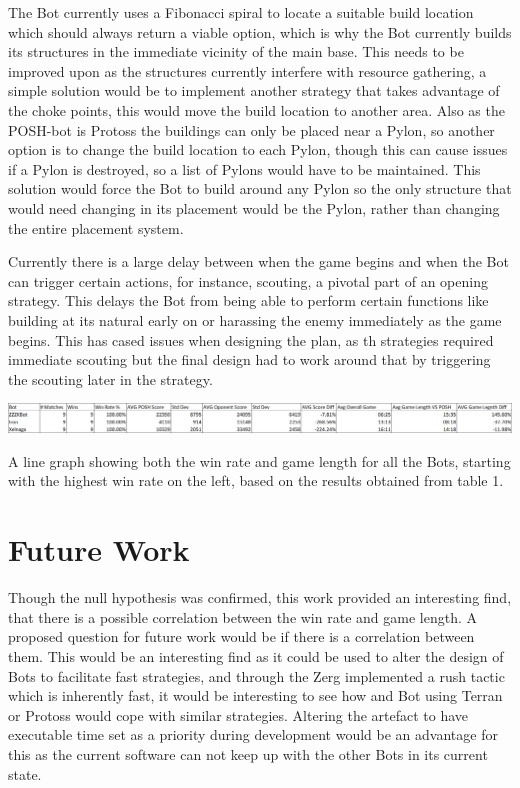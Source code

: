\documentclass[journal]{IEEEtran}
\begin{document}
	The Bot currently uses a Fibonacci spiral to locate a suitable build location which should always return a viable option, which is why the Bot currently builds its structures in the immediate vicinity of the main base. This needs to be improved upon as the structures currently interfere with resource gathering, a simple solution would be to implement another strategy that takes advantage of the choke points, this would move the build location to another area. Also as the POSH-bot is Protoss the buildings can only be placed near a Pylon, so another option is to change the build location to each Pylon, though this can cause issues if a Pylon is destroyed, so a list of Pylons would have to be maintained. This solution would force the Bot to build around any Pylon so the only structure that would need changing in its placement would be the Pylon, rather than changing the entire placement system.
	
	Currently there is a large delay between when the game begins and when the Bot can trigger certain actions, for instance, scouting, a pivotal part of an opening strategy. This delays the Bot from being able to perform certain functions like building at its natural early on or harassing the enemy immediately as the game begins. This has cased issues when designing the plan, as th strategies required immediate scouting but the final design had to work around that by triggering the scouting later in the strategy.	
	\begin{table}
		\centering
		\includegraphics[width=\textwidth]{PvsBots}
		\caption{A line graph showing both the win rate and game length for all the Bots, starting with the highest win rate on the left, based on the results obtained from table 1.}
		\label{Table6}
	\end{table}
	
	\section{Future Work}
	Though the null hypothesis was confirmed, this work provided an interesting find, that there is a possible correlation between the win rate and game length. A proposed question for future work would be if there is a correlation between them. This would be an interesting find as it could be used to alter the design of Bots to facilitate fast strategies, and through the Zerg implemented a rush tactic which is inherently fast, it would be interesting to see how and Bot using Terran or Protoss would cope with similar strategies.
	Altering the artefact to have executable time set as a priority during development would be an advantage for this as the current software can not keep up with the other Bots in its current state.
	
\end{document}
